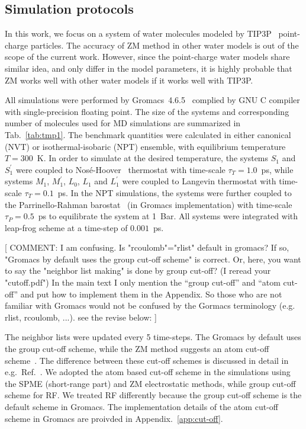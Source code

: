 \documentclass[a4paper,preprint,unsortedaddress,onecolumn,fleqn]{revtex4}
\newcommand{\recheck}[1]{{\color{red} #1}}
\begin{document}
\subsection{Simulation protocols}

\label{sec:protocols} In this work, we focus on a system of water molecules
modeled by TIP3P~\cite{jorgensen1983comparison} point-charge particles. 
The accuracy of ZM method in other water models is out of the scope of the
current work. However, since the point-charge water models share similar
idea, and only differ in the model parameters, it is highly probable that ZM
works well with other water models if it works well with TIP3P.

All simulations were performed by Gromacs~4.6.5~\cite{hess2008gromacs,
pronk2013gromacs} complied by GNU C compiler with single-precision floating
point. The size of the systems and corresponding number of molecules used
for MD simulations are summarized in Tab.~\ref{tab:tmp1}. The benchmark
quantities were calculated in either canonical (NVT) or isothermal-isobaric
(NPT) ensemble, with equilibrium temperature $T=300$~K. In order to simulate
at the desired temperature, the systems $S_{1}$ and $S_{1}^{\prime }$ were
coupled to Nos\'{e}-Hoover~\cite{nose1984molecular,hoover1985canonical}
thermostat with time-scale $\tau _{T}=1.0$~ps, while systems $M_{1}$, $%
M_{1}^{\prime }$, $L_{0}$, $L_{1}$ and $L_{1}^{\prime }$ were coupled to
Langevin thermostat with time-scale $\tau _{T}=0.1$~ps. In the NPT
simulations, the systems were further coupled to the Parrinello-Rahman
barostat~\cite{parrinello1980crystal,parrinello1981polymorphic} (in Gromacs
implementation) with time-scale $\tau _{P}=0.5$~ps to equilibrate the system
at 1~Bar. All systems were integrated with leap-frog scheme at a time-step
of $0.001$~ps.

[{%
\color{blue} COMMENT: I am confusing. Is "rcoulomb"="rlist" default in
gromacs? If so, "Gromacs by default uses the group cut-off scheme" is
correct. Or, here, you want to say the "neighbor list making" is done by
group cut-off? (I reread your "cutoff.pdf")} \recheck{
In the main text I only mention the ``group cut-off'' and ``atom cut-off'' and
put how to implement them in the Appendix.  So those who are not familiar with Gromacs would not be confused by the Gormacs terminology (e.g. rlist, rcoulomb, ...).
see the revise below:
}]

The neighbor lists were updated every 5 time-steps. The Gromacs
by default uses the group cut-off scheme, while the ZM method suggests an
atom cut-off scheme~\cite{fukuda2011molecular,fukuda2013zero}. The difference between these
cut-off schemes is discussed in detail in e.g.~Ref.~\cite%
{hunenberger1998alternative,baumketner2009removing}. We adopted the atom
based cut-off scheme in the simulations using the SPME (short-range part)
and ZM electrostatic methods, \recheck{while group cut-off scheme for RF.
  We treated RF differently because the group cut-off scheme is the default scheme in Gromacs.}
\recheck{The implementation details of the atom cut-off scheme in Gromacs are proivded in Appendix.~\ref{app:cut-off}.}
\end{document}
